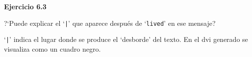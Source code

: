 %

\centerline{\bf Ejercicio 6.3}

\bigskip

 ?`Puede explicar el `{\tt |}' que aparece
despu\'es de `{\tt lived}' en ese mensaje?

\bigskip

 `{\tt |}' indica el lugar donde se produce
el `desborde' del texto. En el dvi generado se visualiza como un
cuadro negro.

\bye